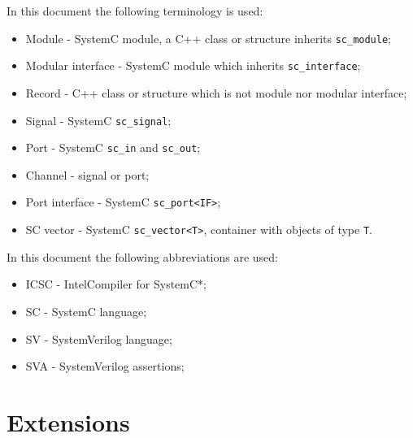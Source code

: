 In this document the following terminology is used:
%
\begin{itemize}
\item Module - SystemC module, a C++ class or structure inherits {\tt sc\_module};
\item Modular interface - SystemC module which inherits {\tt sc\_interface};
\item Record - C++ class or structure which is not module nor modular interface;
\item Signal - SystemC {\tt sc\_signal};
\item Port - SystemC {\tt sc\_in} and {\tt sc\_out};
\item Channel - signal or port;
\item Port interface - SystemC {\tt sc\_port<IF>};
\item SC vector - SystemC {\tt sc\_vector<T>}, container with objects of type {\tt T}.
\end{itemize}
%
In this document the following abbreviations are used:
%
\begin{itemize}
\item ICSC - Intel\textregistered Compiler for SystemC*;
\item SC - SystemC language;
\item SV - SystemVerilog language;
\item SVA - SystemVerilog assertions;
\end{itemize}




\ifdefined\INTEL

\else

\fi






\section{Extensions}\label{section:extensions}

\ifdefined\INTEL
 
\fi






